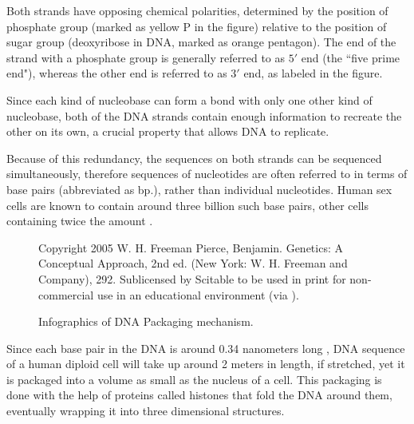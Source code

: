 \documentclass[parskip]{cs4rep}
\begin{document}
Both strands have opposing chemical polarities, determined by the position
of phosphate group (marked as yellow P in the figure) relative to the position of sugar group (deoxyribose in DNA, marked as orange pentagon). The end of the strand with a phosphate group is generally referred to as $5'$ end (the ``five prime end"), whereas the other end is referred to as $3'$ end, as labeled in the figure.

Since each kind of nucleobase can form a bond with only one other kind of
nucleobase, both of the DNA strands contain enough information to recreate the
other on its own, a crucial property that allows DNA to replicate. 

Because of this redundancy, the sequences on both strands can be sequenced simultaneously, therefore sequences of nucleotides are often referred to in terms of base pairs (abbreviated as bp.), rather than individual nucleotides. Human sex cells are known to contain around three billion such base pairs, other cells containing twice the amount \cite{Annunziato:2008wh}.

\begin{figure}[p]
   \centering
   {Copyright 2005 W. H. Freeman Pierce, Benjamin. Genetics: A Conceptual Approach, 2nd ed. (New York: W. H. Freeman and Company), 292. Sublicensed by Scitable to be used in print for non-commercial use in an educational environment (via \cite{Annunziato:2008wh}).}
   
   \caption{Infographics of DNA Packaging mechanism. }
   \label{fig:background:dna_packaging} 
\end{figure}

Since each base pair in the DNA is around 0.34 nanometers long \cite{Annunziato:2008wh},
DNA sequence of a human diploid cell will take up around 2 meters in length, if stretched, yet it is packaged into a volume as small as the nucleus of a cell. This packaging is done with the help of proteins called histones that fold the DNA around them, eventually wrapping it into three dimensional structures.
\end{document}
